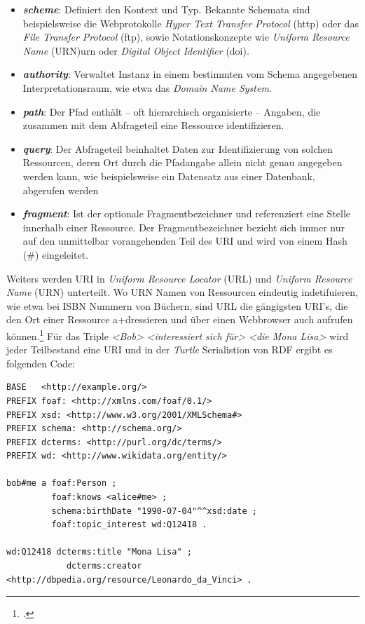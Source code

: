 \documentclass[12pt,a4paper]{article}
\begin{document}
\begin{itemize}
\item \textbf{\textit{scheme}}: Definiert den Kontext und Typ. Bekannte Schemata sind beispielsweise die Webprotokolle \textit{Hyper Text Transfer Protocol} (http) oder das \textit{File Transfer Protocol} (ftp), sowie Notationskonzepte wie \textit{Uniform Resource Name} (URN)urn oder \textit{Digital Object Identifier} (doi).
\item \textbf{\textit{authority}}: Verwaltet Instanz in einem bestimmten vom Schema angegebenen Interpretationsraum, wie etwa das \textit{Domain Name System}.
\item \textbf{\textit{path}}: Der Pfad enthält – oft hierarchisch organisierte – Angaben, die zusammen mit dem Abfrageteil eine Ressource identifizieren. 
\item \textbf{\textit{query}}: Der Abfrageteil beinhaltet Daten zur Identifizierung von solchen Ressourcen, deren Ort durch die Pfadangabe allein nicht genau angegeben werden kann, wie beispielsweise ein Datensatz aus einer Datenbank, abgerufen werden
\item \textbf{\textit{fragment}}: Ist der optionale Fragmentbezeichner und referenziert eine Stelle innerhalb einer Ressource. Der Fragmentbezeichner bezieht sich immer nur auf den unmittelbar vorangehenden Teil des URI und wird von einem Hash (\#) eingeleitet.
\end{itemize}

Weiters werden URI in \textit{Uniform Resource Locator} (URL) und \textit{Uniform Resource Name} (URN) unterteilt. Wo URN Namen von Ressourcen eindeutig indetifuieren, wie etwa bei ISBN Nummern von Büchern, sind URL die gängigsten URI's, die den Ort einer Ressource a+dressieren und über einen Webbrowser auch aufrufen können.\footcite[Vgl.][S.21-22]{powers2003practical} Für das Triple \textit{<Bob>} \textit{<interessiert sich für>} \textit{<die Mona Lisa>} wird jeder Teilbestand eine URI und in der \textit{Turtle} Serialistion von RDF ergibt es folgenden Code:
\begin{lstlisting}[]
BASE   <http://example.org/>
PREFIX foaf: <http://xmlns.com/foaf/0.1/>
PREFIX xsd: <http://www.w3.org/2001/XMLSchema#>
PREFIX schema: <http://schema.org/>
PREFIX dcterms: <http://purl.org/dc/terms/>
PREFIX wd: <http://www.wikidata.org/entity/>

bob#me a foaf:Person ;
         foaf:knows <alice#me> ;
         schema:birthDate "1990-07-04"^^xsd:date ;
         foaf:topic_interest wd:Q12418 .
 
wd:Q12418 dcterms:title "Mona Lisa" ;
            dcterms:creator <http://dbpedia.org/resource/Leonardo_da_Vinci> .
\end{lstlisting}
\end{document}
